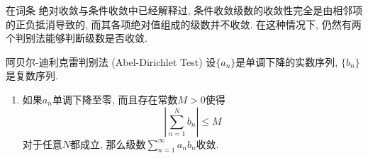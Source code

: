 

在词条 绝对收敛与条件收敛中已经解释过, 条件收敛级数的收敛性完全是由相邻项的正负抵消导致的, 而其各项绝对值组成的级数并不收敛. 在这种情况下, 仍然有两个判别法能够判断级数是否收敛.

\begin{theorem}{阿贝尔-迪利克雷判别法 (Abel-Dirichlet Test)}
设$\{a_n\}$是单调下降的实数序列, $\{b_n\}$是复数序列.

\begin{enumerate}
\item 如果$a_n$单调下降至零, 而且存在常数$M>0$使得
$$
\left|\sum_{n=1}^N b_n\right|\leq M
$$
对于任意$N$都成立, 那么级数$\sum_{n=1}^\infty a_nb_n$收敛.
\end{enumerate}
\end{theorem}